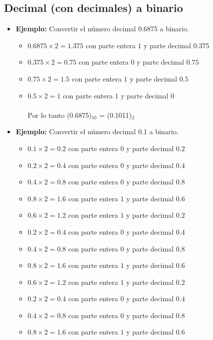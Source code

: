 \documentclass{templateNote}
\begin{document}
\subsection{Decimal (con decimales) a binario}
\begin{itemize}
    \item \textbf{Ejemplo:} Convertir el número decimal 0.6875 a binario.
    \begin{itemize}
        \item $0.6875 \times 2 = 1.375$ con parte entera $1$ y parte decimal $0.375$
        \item $0.375 \times 2 = 0.75$ con parte entera $0$ y parte decimal $0.75$
        \item $0.75 \times 2 = 1.5$ con parte entera $1$ y parte decimal $0.5$
        \item $0.5 \times 2 = 1$ con parte entera $1$ y parte decimal $0$
        \\\\Por lo tanto (0.6875)$_{10}$ = (0.1011)$_2$
    \end{itemize}
    \item \textbf{Ejemplo:} Convertir el número decimal 0.1 a binario.
    \begin{itemize}
        \item $0.1 \times 2 = 0.2$ con parte entera $0$ y parte decimal $0.2$
        \item $0.2 \times 2 = 0.4$ con parte entera $0$ y parte decimal $0.4$
        \item $0.4 \times 2 = 0.8$ con parte entera $0$ y parte decimal $0.8$
        \item $0.8 \times 2 = 1.6$ con parte entera $1$ y parte decimal $0.6$
        \item $0.6 \times 2 = 1.2$ con parte entera $1$ y parte decimal $0.2$
        \item $0.2 \times 2 = 0.4$ con parte entera $0$ y parte decimal $0.4$
        \item $0.4 \times 2 = 0.8$ con parte entera $0$ y parte decimal $0.8$
        \item $0.8 \times 2 = 1.6$ con parte entera $1$ y parte decimal $0.6$
        \item $0.6 \times 2 = 1.2$ con parte entera $1$ y parte decimal $0.2$
        \item $0.2 \times 2 = 0.4$ con parte entera $0$ y parte decimal $0.4$
        \item $0.4 \times 2 = 0.8$ con parte entera $0$ y parte decimal $0.8$
        \item $0.8 \times 2 = 1.6$ con parte entera $1$ y parte decimal $0.6$

\end{itemize}
\end{itemize}
\end{document}
